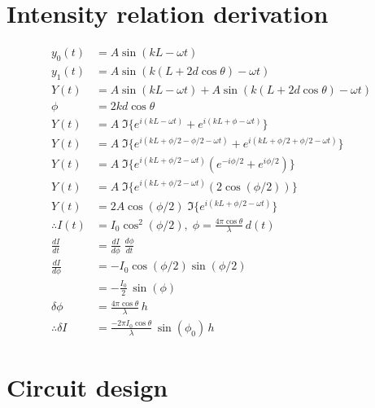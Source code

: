 \documentclass[prb,preprint]{revtex4-1}
\begin{document}
\appendix

\newpage
\section{Intensity relation derivation}
\begin{align}
    y_0(t) &= A \sin{(k L - \omega t)} \\
    y_1(t) &= A \sin{(k (L + 2 d \cos{\theta}) - \omega t)} \\
    Y(t) &= A \sin{(k L - \omega t)} + A \sin{(k (L + 2 d \cos{\theta}) - \omega t)} \\
    \phi &= 2 k d \cos{\theta} \\
    Y(t) &= A\; \Im\{e^{i (k L - \omega t)} + e^{i (k L + \phi - \omega t)}\} \\
    Y(t) &= A\; \Im\{e^{i (k L + \phi/2 - \phi/2 - \omega t)} + e^{i (k L + \phi/2 + \phi/2 - \omega t)}\} \\    
    Y(t) &= A\; \Im\{e^{i (k L + \phi/2 - \omega t)} (e^{- i \phi/2} + e^{i \phi/2})\} \\    
    Y(t) &= A\; \Im\{e^{i (k L + \phi/2 - \omega t)} (2 \cos{(\phi/2)})\} \\ 
    Y(t) &= 2 A \cos{(\phi/2)}\; \Im\{e^{i (k L + \phi/2 - \omega t)}\} \\  
    \therefore I(t) &= I_0 \cos^2{(\phi/2)}, \; \phi = \frac{4 \pi \cos{\theta}}{\lambda}\, d(t) \\
    \frac{dI}{dt} &= \frac{dI}{d\phi}\; \frac{d\phi}{dt}\\
    \frac{dI}{d\phi} &= - I_0 \cos{(\phi/2)} \sin{(\phi/2)}\\
    &= - \frac{I_0}{2}\, \sin{(\phi)}\\
    \delta\phi &= \frac{4 \pi \cos{\theta}}{\lambda}\, h\\
    \therefore \delta I &= \frac{- 2 \pi I_0 \cos{\theta}}{\lambda}\,\sin{(\phi_0)}\, h
\end{align}

\section{Circuit design}
\end{document}
